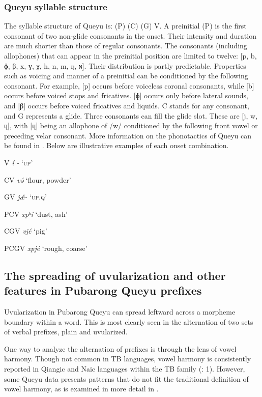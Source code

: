 \documentclass[output=paper]{langscibook}
\begin{document}
\subsubsection{Queyu syllable structure}\label{sec:guan:2.2.2}
The syllable structure of Queyu isː (P) (C) (G) V. A preinitial (P) is the first consonant of two non-glide consonants in the onset. Their intensity and duration are much shorter than those of regular consonants. The consonants (including allophones) that can appear in the preinitial position are limited to twelve: [p, b, ɸ, β, x, ɣ, χ, h, n, m, ŋ, ɴ]. Their distribution is partly predictable. Properties such as voicing and manner of a preinitial can be conditioned by the following consonant. For example, [p] occurs before voiceless coronal consonants, while [b] occurs before voiced stops and fricatives. [ɸ] occurs only before lateral sounds, and [β] occurs before voiced fricatives and liquids. C stands for any consonant, and G represents a glide. Three consonants can fill the glide slot. These are [j, w, ɥ], with [ɥ] being an allophone of /w/ conditioned by the following front vowel or preceding velar consonant. More information on the phonotactics of Queyu can be found in \citet{Guan2024}. Below are illustrative examples of each onset combination.
\ea%
    \label{ex:guan:2}
\begin{xlist}
\item V    \textit{í{} {}-}  ‘\textsc{up}’
\item CV   \textit{və́}  ‘flour, powder’ 
\item GV    \textit{jæ̌-}  ‘\textsc{up.q}’
\item PCV  \textit{xpʰí}  ‘dust, ash’
\item CGV  \textit{vjé}  ‘pig’ 
\item PCGV  \textit{xpjé}  ‘rough, coarse’
\end{xlist}
\z
\subsection{The spreading of uvularization and other features in Pubarong Queyu prefixes}\label{sec:guan:2.3}

Uvularization in Pubarong Queyu can spread leftward across a morpheme boundary within a word. This is most clearly seen in the alternation of two sets of verbal prefixes, plain and uvularized. 

One way to analyze the alternation of prefixes is through the lens of vowel harmony. Though not common in TB languages, vowel harmony is consistently reported in Qiangic and Naic languages within the TB family (\citealt{Chirkova2024}ː 1). However, some Queyu data presents patterns that do not fit the traditional definition of vowel harmony, as is examined in more detail in .
\end{document}
